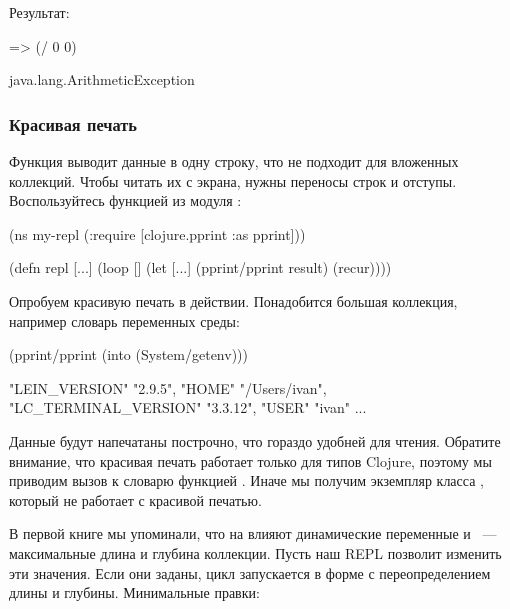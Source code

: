 Результат:

\begin{english}
  \begin{clojure}
=> (/ 0 0)

java.lang.ArithmeticException
  \end{clojure}
\end{english}

\subsubsection{Красивая печать}

Функция  выводит данные в одну строку, что не подходит для вложенных коллекций. Чтобы читать их с экрана, нужны переносы строк и отступы. Воспользуйтесь функцией  из модуля :

\begin{english}
  \begin{clojure}
(ns my-repl
  (:require
   [clojure.pprint :as pprint]))

(defn repl
  [...]
  (loop []
    (let [...]
      (pprint/pprint result)
      (recur))))
  \end{clojure}
\end{english}

Опробуем красивую печать в действии. Понадобится большая коллекция, например словарь переменных среды:

\pagebreaklarge

\begin{english}
  \begin{clojure}
(pprint/pprint
  (into {} (System/getenv)))

{"LEIN_VERSION" "2.9.5",
 "HOME" "/Users/ivan",
 "LC_TERMINAL_VERSION" "3.3.12",
 "USER" "ivan"
 ...
 }
  \end{clojure}
\end{english}

Данные будут напечатаны построчно, что гораздо удобней для чтения. Обратите внимание, что красивая печать работает только для типов Clojure, поэтому мы приводим вызов  к словарю функцией . Иначе мы получим экземпляр класса , который не работает с красивой печатью.

В первой книге мы упоминали, что на  влияют динамические переменные  и ~--- максимальные длина и глубина коллекции. Пусть наш REPL позволит изменить эти значения. Если они заданы, цикл запускается в форме  с переопределением длины и глубины. Минимальные правки:


